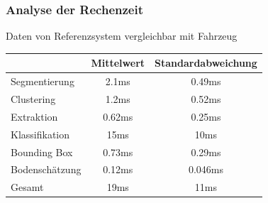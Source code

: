 \begin{frame}
    \frametitle{Analyse der Rechenzeit}
    Daten von Referenzsystem vergleichbar mit Fahrzeug
    \begin{table}
        \begin{tabular}{l|S[table-format=2.2]S[table-format=1.3]}
            \toprule
             & {Mittelwert} & {Standardabweichung} \\
            \midrule
            Segmentierung & 2.1ms & 0.49ms \\
            Clustering & 1.2ms & 0.52ms \\
            Extraktion  & 0.62ms & 0.25ms \\
            Klassifikation & 15ms & 10ms \\
            Bounding Box & 0.73ms & 0.29ms \\
            Bodenschätzung & 0.12ms & 0.046ms \\
            \midrule
            Gesamt & 19ms & 11ms \\
            \bottomrule
        \end{tabular}
    \end{table}
\end{frame}

